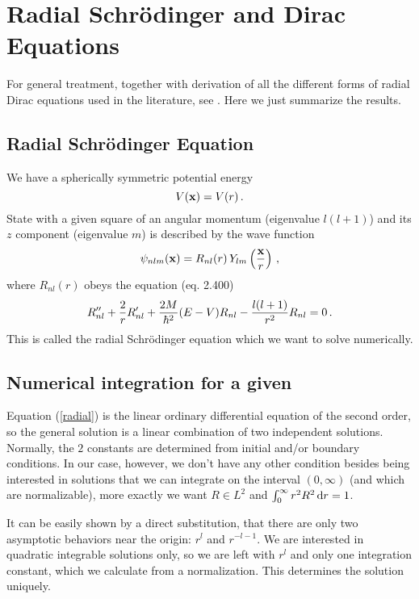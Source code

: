 \section{Radial Schrödinger and Dirac Equations}

For general treatment, together with derivation of all the different forms of
radial Dirac equations used in the literature, see \cite{bachelor-thesis}. Here we just summarize the results.

\subsection{Radial Schrödinger Equation}

We have a spherically symmetric potential energy 
\begin{equation*}
  V({\bf x})=V(r)\,.
\end{equation*}
State with a given square of an angular momentum (eigenvalue $l(l+1)$) and its $z$ component (eigenvalue $m$) is described by the wave function 
\begin{equation}
  \psi_{nlm}({\bf x})=R_{nl}(r)\,Y_{lm}\left({\bf x}\over r\right)\,,  \label{psi}
\end{equation}
where $R_{nl}(r)$ obeys the equation \cite{formanek} (eq. 2.400) 
\begin{equation}
  R_{nl}''+{2\over r}R_{nl}'+{2M\over\hbar^2}(E-V)R_{nl}- {l(l+1)\over r^2}R_{nl}=0\,.  \label{radial}
\end{equation}
This is called the radial Schrödinger equation which we want to solve numerically.

\subsection{Numerical integration for a given }

Equation (\ref{radial}) is the linear ordinary differential equation of the second order, so the general solution is a linear combination of two independent solutions. Normally, the $2$ constants are determined from initial and/or boundary conditions. In our case, however, we don't have any other condition besides being interested in solutions that we can integrate on the interval $(0,\infty)$ (and which are normalizable), more exactly we want $R\in L^2$ and $\int_0^\infty r^2R^2\,{\rm d} r=1$.

It can be easily shown by a direct substitution, that there are only two asymptotic behaviors near the origin: $r^l$ and $r^{-l-1}$. We are interested in quadratic integrable solutions only, so we are left with $r^l$ and only one integration constant, which we calculate from a normalization. This determines the solution uniquely.

